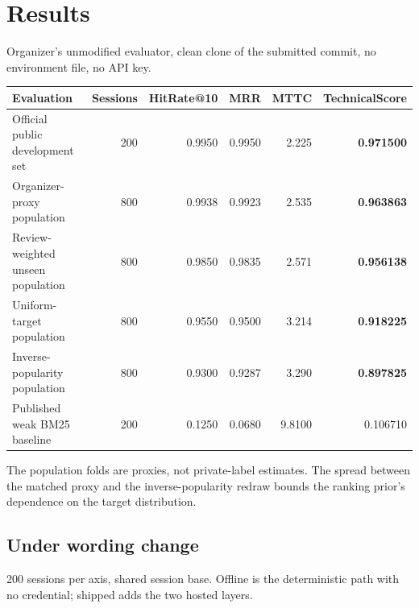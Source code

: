 \documentclass[11pt,a4paper]{article}
\begin{document}
\section{Results}
Organizer's unmodified evaluator, clean clone of the submitted commit, no environment file, no API key.

\begin{center}\small\begin{tabular}{@{}lrrrrr@{}}\toprule
\textbf{Evaluation} & \textbf{Sessions} & \textbf{HitRate@10} & \textbf{MRR} & \textbf{MTTC} & \textbf{TechnicalScore} \\ \midrule
Official public development set & 200 & 0.9950 & 0.9950 & 2.225 & \textbf{0.971500} \\
Organizer-proxy population & 800 & 0.9938 & 0.9923 & 2.535 & \textbf{0.963863} \\
Review-weighted unseen population & 800 & 0.9850 & 0.9835 & 2.571 & \textbf{0.956138} \\
Uniform-target population & 800 & 0.9550 & 0.9500 & 3.214 & \textbf{0.918225} \\
Inverse-popularity population & 800 & 0.9300 & 0.9287 & 3.290 & \textbf{0.897825} \\
\midrule
Published weak BM25 baseline & 200 & 0.1250 & 0.0680 & 9.8100 & 0.106710 \\
\bottomrule\end{tabular}\end{center}
The population folds are proxies, not private-label estimates. The spread between the matched proxy and the inverse-popularity redraw bounds the ranking prior's dependence on the target distribution.

\subsection*{Under wording change}
200 sessions per axis, shared session base. Offline is the deterministic path with no credential; shipped adds the two hosted layers.
\end{document}
